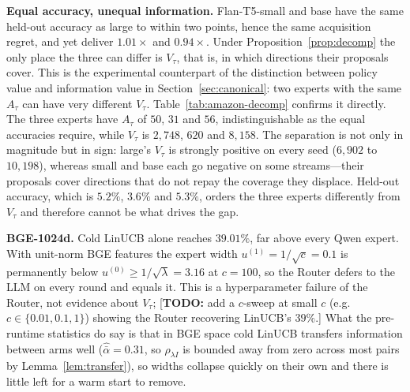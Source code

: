 \documentclass{article}
\theoremstyle{definition}
\theoremstyle{remark}
\theoremstyle{remark}
\newcommand{\todo}[1]{\textcolor{red!70!black}{[\textbf{TODO:} #1]}}
\begin{document}
\textbf{Equal accuracy, unequal information.} Flan-T5-small and base have the
same held-out accuracy as large to within two points, hence the same
acquisition regret, and yet deliver $1.01\times$ and $0.94\times$. Under
Proposition~\ref{prop:decomp} the only place the three can differ is
$V_\tau$, that is, in which directions their proposals cover. This is the
experimental counterpart of the distinction between policy value and
information value in Section~\ref{sec:canonical}: two experts with the same
$A_\tau$ can have very different $V_\tau$. Table~\ref{tab:amazon-decomp}
confirms it directly. The three experts have $A_\tau$ of $50$, $31$ and $56$,
indistinguishable as the equal accuracies require, while $V_\tau$ is $2{,}748$,
$620$ and $8{,}158$. The separation is not only in magnitude but in sign:
large's $V_\tau$ is strongly positive on every seed ($6{,}902$ to $10{,}198$),
whereas small and base each go negative on some streams---their proposals
cover directions that do not repay the coverage they displace. Held-out
accuracy, which is $5.2\%$, $3.6\%$ and $5.3\%$, orders the three experts
differently from $V_\tau$ and therefore cannot be what drives the gap.

\textbf{BGE-1024d.} Cold LinUCB alone reaches $39.01\%$, far above every Qwen
expert. With unit-norm BGE features the expert width $u^{(1)}=1/\sqrt c=0.1$
is permanently below $u^{(0)}\ge1/\sqrt\lambda=3.16$ at $c=100$, so the Router
defers to the LLM on every round and equals it. This is a hyperparameter
failure of the Router, not evidence about $V_\tau$; \todo{add a $c$-sweep at
small $c$ (e.g.\ $c\in\{0.01,0.1,1\}$) showing the Router recovering LinUCB's
$39\%$.} What the pre-runtime statistics do say
is that in BGE space cold LinUCB transfers information between arms well
($\widehat{\bar\alpha}=0.31$, so $\rho_{\lambda I}$ is bounded away from zero
across most pairs by Lemma~\ref{lem:transfer}), so widths collapse quickly on
their own and there is little left for a warm start to remove.
\end{document}
